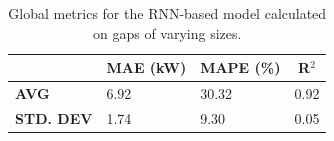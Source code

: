 \begin{table}[H]
	\centering
	\begin{tabular}{l|l|l|l}
		                                        &
		\multicolumn{1}{c|}{\textbf{MAE (kW)}}  &
		\multicolumn{1}{c|}{\textbf{MAPE (\%)}} &
		\multicolumn{1}{c}{\textbf{R$^2$}}                            \\
		\hline
		\textbf{AVG}                            & 6.92 & 30.32 & 0.92 \\
		\textbf{STD. DEV}                       & 1.74 & 9.30  & 0.05
	\end{tabular}
	\caption{Global metrics for the RNN-based model calculated on gaps of varying sizes.}
	\label{tab:grrunglobalmetrics}
\end{table}


